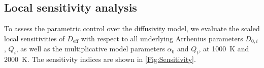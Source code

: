 \documentclass[%
preprint,
amsmath,amssymb,
aps,
]{revtex4-2}
\newcommand{\?}{\stackrel{?}{=}}
\begin{document}




\subsection{Local sensitivity analysis}

To assess the parametric control over the diffusivity model, we evaluate the scaled local sensitivities of $D_{\mathrm{eff}}$ with respect to all underlying Arrhenius parameters $D_{0,i}$, $Q_i$, as well as the multiplicative model parameters $\alpha_0$ and $Q_t$, at 1000~K and 2000~K. The sensitivity indices are shown in \cref{Fig:Sensitivity}.
\end{document}
